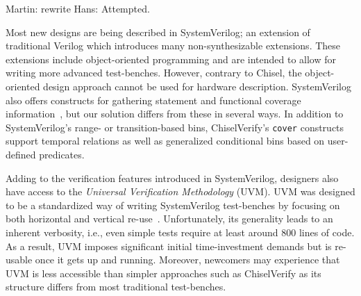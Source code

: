 \documentclass[conference]{IEEEtran}
\newcommand{\martin}[1]{{\color{blue} Martin: #1}}
\newcommand{\hjd}[1]{{\color{pink} Hans: #1}}
\begin{document}
\martin{rewrite} \hjd{Attempted.}



Most new designs are being described in SystemVerilog; an extension of traditional Verilog 
which introduces many non-synthesizable extensions. These extensions include object-oriented 
programming and are intended to allow for writing more advanced test-benches. However, 
contrary to Chisel, the object-oriented design approach cannot be used for hardware 
description. SystemVerilog also offers constructs for gathering statement and functional 
coverage information~\cite{spear2008systemverilog}, but our solution differs from these in 
several ways. In addition to SystemVerilog's range- or transition-based bins, 
ChiselVerify's \texttt{cover} constructs support temporal relations as well as generalized 
conditional bins based on user-defined predicates. 


Adding to the verification features introduced in SystemVerilog, designers also have 
access to the \textit{Universal Verification Methodology} (UVM). UVM was designed to be a 
standardized way of writing SystemVerilog test-benches by focusing on both horizontal and 
vertical re-use~\cite{uvm2015}. Unfortunately, its generality leads to an inherent 
verbosity, i.e., even simple tests require at least around 800 lines of code. As a result, 
UVM imposes significant initial time-investment demands but is re-usable once it gets up and 
running. Moreover, newcomers may experience that UVM is less accessible than simpler approaches 
such as ChiselVerify as its structure differs from most traditional test-benches.
\end{document}
